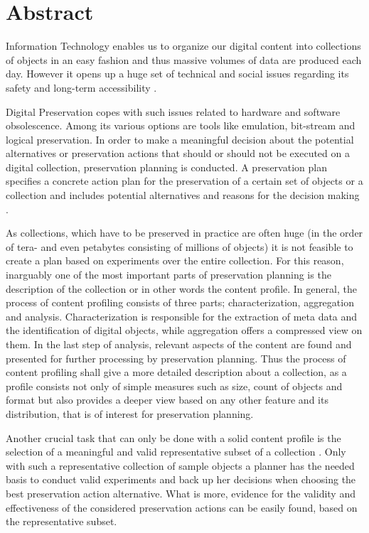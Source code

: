 \chapter*{Abstract}
Information Technology enables us to organize our digital content into collections of objects in an easy fashion and thus massive volumes of data are produced each day.
However it opens up a huge set of technical and social issues regarding its safety and long-term accessibility \cite{Lorie:2001:LTP:379437.379726}.

Digital Preservation copes with such issues related to hardware and software obsolescence. Among its various
options are tools like emulation, bit-stream and logical preservation. In order to make a meaningful decision
about the potential alternatives or preservation actions that should or should not be executed on a
digital collection, preservation planning is conducted. A preservation plan specifies a concrete action plan for the preservation
of a certain set of objects or a collection and includes potential alternatives and reasons for the decision making  \cite{Becker:2009fk}. 

As collections, which have to be preserved in practice are often huge (in the order of tera- and even petabytes consisting of millions of objects) it is not feasible to create a plan based on experiments over the entire collection. For this reason, inarguably one of the most important parts of preservation planning is the description of the collection or in other words the content profile. In general, the process of content profiling consists of three parts; characterization, aggregation and analysis. Characterization is responsible for the extraction of meta data and the identification of digital objects, while aggregation offers a compressed view on them. In the last step of analysis, relevant aspects of the content are found and presented for further processing by preservation planning. Thus the process of content profiling shall give a more detailed description about a collection, as a profile consists not only of simple measures such as size, count of objects and format but also provides a deeper view based on any other feature and its distribution, that is of interest for preservation planning.

Another crucial task that can only be done with a solid content profile is the selection of a meaningful and valid representative subset of a collection \cite{Becker:2011:PDT:1998076.1998089, Pan05findingrepresentative}. Only with such a representative collection of sample objects a planner 
has the needed basis to conduct valid experiments and back up her decisions when choosing the best
preservation action alternative. What is more, evidence for the validity and effectiveness of the considered preservation actions can be easily found, based on the representative subset.

